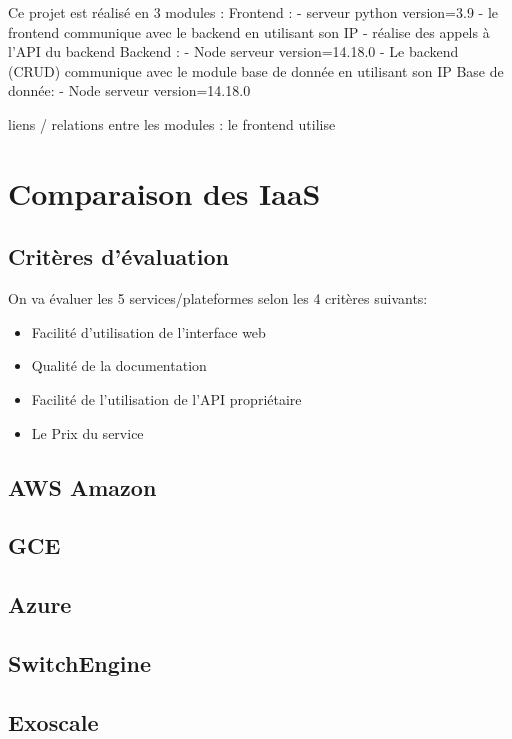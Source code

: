 \documentclass{article}
\begin{document}
Ce projet est réalisé en 3 modules :
Frontend :
    - serveur python  version=3.9
    - le frontend communique avec le backend en utilisant son IP
    - réalise des appels à l'API du backend
Backend : 
    - Node serveur version=14.18.0
    - Le backend (CRUD) communique avec le module base de donnée en utilisant son IP
Base de donnée:
    - Node serveur version=14.18.0


liens / relations entre les modules :
le frontend utilise     

\section{Comparaison des IaaS}
\subsection{Critères d'évaluation}
On va évaluer les 5 services/plateformes selon les 4 critères suivants:
\begin{itemize}
    \setlength\itemsep{-0.7em}
    \item Facilité d'utilisation de l'interface web\\
    \item Qualité de la documentation \\
    \item Facilité de l'utilisation de l'API propriétaire \\ 
    \item Le Prix du service
\end{itemize}
 
\subsection{AWS Amazon}
\subsection{GCE}
\subsection{Azure}
\subsection{SwitchEngine}
\subsection{Exoscale}
\end{document}
